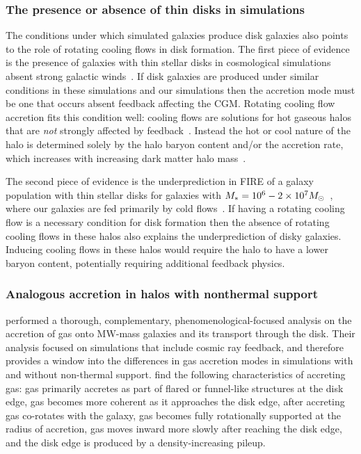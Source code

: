 \documentclass[fleqn,usenatbib]{mnras}
\begin{document}
\subsubsection{The presence or absence of thin disks in simulations}
\label{s: disk formation -- population}

The conditions under which simulated galaxies produce disk galaxies also points to the role of rotating cooling flows in disk formation.
The first piece of evidence is the presence of galaxies with thin stellar disks in cosmological simulations absent strong galactic winds~\citep{Guedes2011, Bird2013}.
If disk galaxies are produced under similar conditions in these simulations and our simulations then the accretion mode must be one that occurs absent feedback affecting the CGM.
Rotating cooling flow accretion fits this condition well:
cooling flows are solutions for hot gaseous halos that are \textit{not} strongly affected by feedback~\citep{Stern2019}.
Instead the hot or cool nature of the halo is determined solely by the halo baryon content and/or the accretion rate, which increases with increasing dark matter halo mass~\citep{Stern2020a}.

The second piece of evidence is the underprediction in FIRE of a galaxy population with thin stellar disks for galaxies with $M_* = 10^6 \-- 2 \times 10^7 M_\odot$~\citep{El-Badry2018a}, where our galaxies are fed primarily by cold flows~\citep{Stern2020}.
If having a rotating cooling flow is a necessary condition for disk formation then the absence of rotating cooling flows in these halos also explains the underprediction of disky galaxies.
Inducing cooling flows in these halos would require the halo to have a lower baryon content, potentially requiring additional feedback physics.

\subsubsection{Analogous accretion in halos with nonthermal support}

\cite{Trapp2021} performed a thorough, complementary, phenomenological-focused analysis on the accretion of gas onto MW-mass galaxies and its transport through the disk.
Their analysis focused on simulations that include cosmic ray feedback, and therefore provides a window into the differences in gas accretion modes in simulations with and without non-thermal support.
\citeauthor{Trapp2021} find the following characteristics of accreting gas:
gas primarily accretes as part of flared or funnel-like structures at the disk edge,
gas becomes more coherent as it approaches the disk edge,
after accreting gas co-rotates with the galaxy,
gas becomes fully rotationally supported at the radius of accretion,
gas moves inward more slowly after reaching the disk edge,
and the disk edge is produced by a density-increasing pileup.
\end{document}
